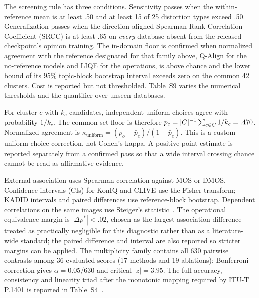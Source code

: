 The screening rule has three conditions. Sensitivity
passes when the within-reference mean is at least .50 and at least 15 of 25
distortion types exceed .50. Generalization passes when the direction-aligned
Spearman Rank Correlation Coefficient (SRCC) is at least .65 on \emph{every}
database absent from the released checkpoint's
opinion training. The in-domain floor is confirmed when normalized agreement
with the reference designated for that family above, Q-Align for the no-reference models
and LIQE for the operations, is above chance and the lower bound of its 95\% topic-block
bootstrap interval exceeds zero on the common 42 clusters. Cost is reported but
not thresholded. Table~S9 varies the numerical thresholds and the quantifier
over unseen databases.

For cluster $c$ with $k_c$ candidates, independent uniform choices agree with
probability $1/k_c$. The common-set floor is therefore
$\bar p_e=|C|^{-1}\sum_{c\in C}1/k_c=.470{}$. Normalized agreement is
$\kappa_{\mathrm{uniform}}=(p_o-\bar p_e)/(1-\bar p_e)$. This is a custom
uniform-choice correction, not Cohen's kappa. A positive point estimate is
reported separately from a confirmed pass so that a wide interval crossing
chance cannot be read as affirmative evidence.

External association uses Spearman correlation against MOS or DMOS. Confidence
intervals (CIs) for KonIQ and CLIVE use the Fisher transform; KADID intervals and paired differences
use reference-block bootstrap. Dependent correlations on the same images use
Steiger's statistic~\citep{steiger1980comparing}. The operational equivalence
margin is $|\Delta\rho^{*}|<.02$, chosen as the largest association difference
treated as practically negligible for this diagnostic rather than as a
literature-wide standard; the paired difference and interval are also reported
so stricter margins can be applied. The multiplicity family contains all 630
pairwise contrasts among 36 evaluated scores (17 methods and 19 ablations);
Bonferroni correction gives $\alpha=0.05/630$ and critical $|z|=3.95$. The full accuracy, consistency and linearity
triad after the monotonic mapping required by ITU-T P.1401 is reported in
Table~S4~\citep{itu_p1401}.


